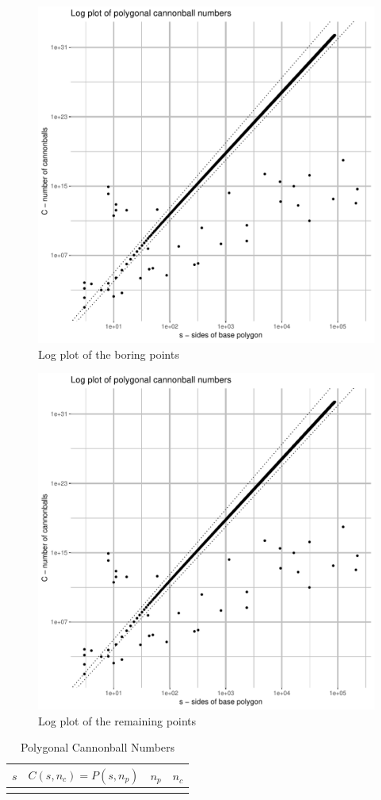 \begin{figure}[H]
\centering
\includegraphics[width=\textwidth,page=3]{../graph/Rplots.pdf}
\caption{Log plot of the boring points}
\label{fig_log_boring}
\end{figure}

\begin{figure}[H]
\centering
\includegraphics[width=\textwidth,page=4]{../graph/Rplots.pdf}
\caption{Log plot of the remaining points}
\label{fig_log_interesting}
\end{figure}

\begin{longtable}{*4r}
\toprule
\boldmath \(s\) & \boldmath \(C(s, n_c) = P(s, n_p)\)
& \boldmath \(n_p\) & \boldmath \(n_c\) \\
\midrule
\endhead

\bottomrule
\caption{Polygonal Cannonball Numbers}
\label{tab_ugly}
\end{longtable}
